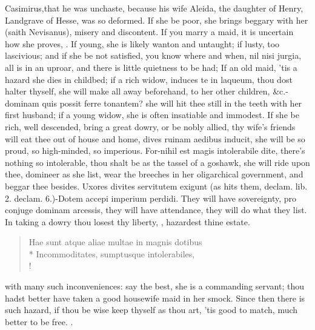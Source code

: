 Casimirus,that he was unchaste, because his wife Aleida, the
daughter of Henry, Landgrave of Hesse, was so deformed. If she be poor,
she brings beggary with her (saith Nevisanus), misery and discontent.
If you marry a maid, it is uncertain how she proves, . If young, she is likely wanton and untaught;
if lusty, too lascivious; and if she be not satisfied, you know where
and when, nil nisi jurgia, all is in an uproar, and there is little
quietness to be had; If an old maid, 'tis a hazard she dies in
childbed; if a rich widow, induces te in laqueum, thou dost
halter thyself, she will make all away beforehand, to her other
children, \&c.-dominam quis possit ferre tonantem? she will hit
thee still in the teeth with her first husband; if a young widow, she
is often insatiable and immodest. If she be rich, well descended, bring
a great dowry, or be nobly allied, thy wife's friends will eat thee out
of house and home, dives ruinam aedibus inducit, she will be so proud,
so high-minded, so imperious. For-nihil est magis intolerabile dite,
there's nothing so intolerable, thou shalt be as the tassel of a
goshawk, she will ride upon thee, domineer as she list, wear the
breeches in her oligarchical government, and beggar thee besides.
Uxores divites servitutem exigunt (as \Seneca{} hits them, declam. lib. 2.
declam. 6.)-Dotem accepi imperium perdidi. They will have sovereignty,
pro conjuge dominam arcessis, they will have attendance, they will do
what they list. In taking a dowry thou losest thy liberty, , hazardest thine estate.
%
\begin{latin}%
\begin{verse}%
Hae sunt atque aliae multae in magnis dotibus\\*
Incommoditates, sumptusque intolerabiles, \etc{}\\!
\end{verse}%
\end{latin}%

with many such inconveniences: say the best, she is a commanding
servant; thou hadst better have taken a good housewife maid in her
smock. Since then there is such hazard, if thou be wise keep thyself as
thou art, 'tis good to match, much better to be free.
%
.
%

